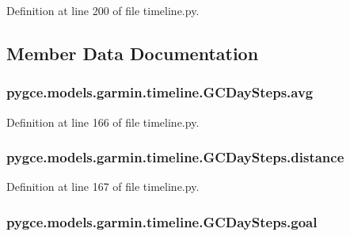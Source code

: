 Definition at line 200 of file timeline.\+py.



\subsection{Member Data Documentation}
\subsubsection[{\texorpdfstring{avg}{avg}}]{\setlength{\rightskip}{0pt plus 5cm}pygce.\+models.\+garmin.\+timeline.\+G\+C\+Day\+Steps.\+avg}\hypertarget{classpygce_1_1models_1_1garmin_1_1timeline_1_1_g_c_day_steps_a598091ff91043c28a7bb4711f861ff71}{}\label{classpygce_1_1models_1_1garmin_1_1timeline_1_1_g_c_day_steps_a598091ff91043c28a7bb4711f861ff71}


Definition at line 166 of file timeline.\+py.

\subsubsection[{\texorpdfstring{distance}{distance}}]{\setlength{\rightskip}{0pt plus 5cm}pygce.\+models.\+garmin.\+timeline.\+G\+C\+Day\+Steps.\+distance}\hypertarget{classpygce_1_1models_1_1garmin_1_1timeline_1_1_g_c_day_steps_a3fe1eac606ace83c095f9c376d1e09ba}{}\label{classpygce_1_1models_1_1garmin_1_1timeline_1_1_g_c_day_steps_a3fe1eac606ace83c095f9c376d1e09ba}


Definition at line 167 of file timeline.\+py.

\subsubsection[{\texorpdfstring{goal}{goal}}]{\setlength{\rightskip}{0pt plus 5cm}pygce.\+models.\+garmin.\+timeline.\+G\+C\+Day\+Steps.\+goal}\hypertarget{classpygce_1_1models_1_1garmin_1_1timeline_1_1_g_c_day_steps_a60204221cb98c4d801fa4265c2dbf5ef}{}\label{classpygce_1_1models_1_1garmin_1_1timeline_1_1_g_c_day_steps_a60204221cb98c4d801fa4265c2dbf5ef}



